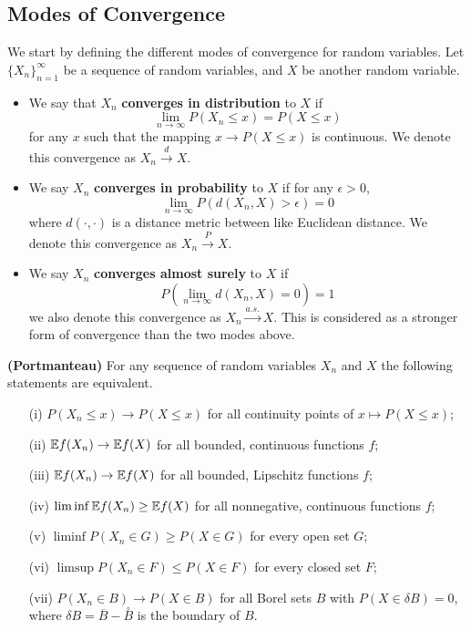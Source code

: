 \documentclass{article}
\begin{document}
\subsection{Modes of Convergence}

We start by defining the different modes of convergence for random variables. Let $\{X_n\}_{n=1}^{\infty}$ be a sequence of random variables, and $X$ be another random variable. 

\begin{itemize}
    \item We say that $X_n$ \textbf{converges in distribution} to $X$ if
    \begin{equation}
        \lim_{n \rightarrow \infty} P(X_n \leq x) = P(X \leq x)
    \end{equation}
    for any $x$ such that the mapping $x \to P(X \leq x)$ is continuous. We denote this convergence as $X_n \xrightarrow{d} X$.
    
    \item We say $X_n$ \textbf{converges in probability} to $X$ if for any $\epsilon > 0$, 
    \begin{equation}
        \lim_{n \rightarrow \infty} P(d(X_n, X) > \epsilon) = 0
    \end{equation}
    where $d(\cdot, \cdot)$ is a distance metric between like Euclidean distance. We denote this convergence as $X_n \xrightarrow{P} X$.

    \item We say $X_n$ \textbf{converges almost surely} to $X$ if 
    \begin{equation}
        P\left(\lim_{n \rightarrow \infty} d(X_n, X) = 0  \right) = 1
    \end{equation}
    we also denote this convergence as $X_n \xrightarrow{a.s.} X$. This is considered as a stronger form of convergence than the two modes above.
\end{itemize}

\begin{lemma}
\label{lemma:portmanteau}
\textbf{(Portmanteau)} For any sequence of random variables $X_n$ and $X$ the following statements are equivalent.
\begin{itemize}
    \item[(i)] $P(X_n \leq x) \to P(X \leq x)$ for all continuity points of $x \mapsto P(X \leq x)$;
    \item[(ii)] $\mathbb{E} f(X_n) \to \mathbb{E} f(X)$ for all bounded, continuous functions $f$;
    \item[(iii)] $\mathbb{E} f(X_n) \to \mathbb{E} f(X)$ for all bounded, Lipschitz functions $f$;
    \item[(iv)] $\liminf \mathbb{E} f(X_n) \geq \mathbb{E} f(X)$ for all nonnegative, continuous functions $f$;
    \item[(v)] $\liminf P(X_n \in G) \geq P(X \in G)$ for every open set $G$;
    \item[(vi)] $\limsup P(X_n \in F) \leq P(X \in F)$ for every closed set $F$;
    \item[(vii)] $P(X_n \in B) \to P(X \in B)$ for all Borel sets $B$ with $P(X \in \delta B) = 0$, where $\delta B = \overline{B} - \overset{\circ}{B}$ is the boundary of $B$.
\end{itemize}
\end{lemma}
\end{document}
